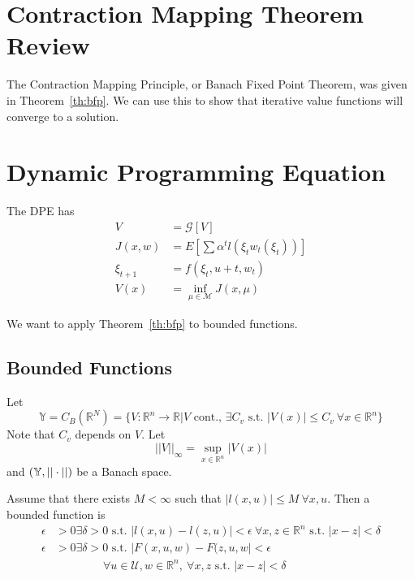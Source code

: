 \mainmatter%
\setcounter{page}{1}

\lectureseries[\course]{\course}

\date{October 22, 2009}

\setaddress%

\setcounter{lecture}{7}
\setcounter{chapter}{7}


\section{Contraction Mapping Theorem Review}
The Contraction Mapping Principle, or Banach Fixed Point Theorem, was given in Theorem~\ref{th:bfp}.
We can use this to show that iterative value functions will converge to a solution.

\section{Dynamic Programming Equation}
The DPE has
\begin{align*}
V&=\mathcal{G}[V] \\
J(x,w) &= E[\sum\alpha^t l(\xi_t w_t(\xi_t))] \\
\xi_{t+1} &= f(\xi_t,u+t,w_t) \\
V(x) &= \inf_{\mu\in\mathcal{M}}J(x,\mu)
\end{align*}

We want to apply Theorem~\ref{th:bfp} to bounded functions.

\subsection{Bounded Functions}
Let
$$\mathbb{Y} = C_B(\mathbb{R}^N) = \{V:\mathbb{R}^n\to\mathbb{R} | V \text{~cont.,~} \exists C_v \text{~s.t.~} |V(x)|\leq C_v~\forall x\in\mathbb{R}^n\}$$
Note that $C_v$ depends on $V$.
Let
$$||V||_\infty = \sup_{x\in\mathbb{R}^n}|V(x)|$$
and $(\mathbb{Y},||\cdot||)$ be a Banach space.

Assume that there exists $M<\infty$ such that $|l(x,u)|\leq M~\forall x,u$.
Then a bounded function is
\begin{align*}
\epsilon&>0 \exists \delta>0 \text{~s.t.~} |l(x,u)-l(z,u)|<\epsilon~\forall x,z\in\mathbb{R}^n \text{~s.t.~} |x-z|<\delta \\
\epsilon&>0 \exists \delta>0 \text{~s.t.~} |F(x,u,w)-F(z,u,w|<\epsilon \\
&\qquad\qquad~\forall u\in\mathcal{U},w\in\mathbb{R}^n,~\forall x,z \text{~s.t.~} |x-z|<\delta
\end{align*}

